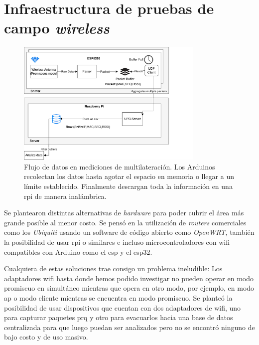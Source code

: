 \section{Infraestructura de pruebas de campo \textit{wireless}} \label{sssec:num1}

\begin{figure}[!htb]
	\centering
	\includegraphics[width=0.8\textwidth]{Figuras/infraestructure/arduino-rpi-multi.png}
	\captionsetup{margin=2cm}
	\caption[Flujo de datos en mediciones de multilateración]{Flujo de datos en mediciones de multilateración. Los Arduinos recolectan los datos hasta agotar el espacio en memoria o llegar a un límite establecido. Finalmente descargan toda la información en una \acs{rpi} de manera inalámbrica.}
	\label{fig:infra-diagram-arduino}
\end{figure}

Se plantearon distintas alternativas de \textit{hardware} para poder cubrir el área más grande posible al menor costo. Se pensó en la utilización de \textit{routers} comerciales como los \textit{Ubiquiti} usando un software de código abierto como \textit{OpenWRT}, también la posibilidad de usar \acl{rpi} o similares e incluso microcontroladores con \acs{wifi} compatibles con Arduino como el \acs{esp} y el \acs{esp32}.

Cualquiera de estas soluciones trae consigo un problema ineludible: Los adaptadores \acs{wifi} hasta donde hemos podido investigar no pueden operar en modo promiscuo en simultáneo mientras que opera en otro modo, por ejemplo, en modo \acl{ap} o modo cliente mientras se encuentra en modo promiscuo. Se planteó la posibilidad de usar dispositivos que cuentan con dos adaptadores de \acs{wifi}, uno para capturar paquetes \acl{prq} y otro para evacuarlos hacia una base de datos centralizada para que luego puedan ser analizados pero no se encontró ninguno de bajo costo y de uso masivo.

